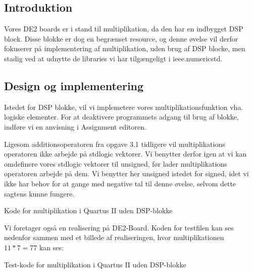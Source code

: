 \documentclass[../journal2.tex]{subfiles}
\begin{document}
\subsection{Introduktion}

Vores DE2 boards er i stand til multiplikation, da den har en indbygget DSP block. Disse blokke er dog en begrænset resource, og denne øvelse vil derfor fokuserer på implementering af multiplikation, uden brug af DSP blocke, men stadig ved at udnytte de libraries vi har tilgængeligt i ieee.numeric\textunderscore std.

\subsection{Design og implementering}

Istedet for DSP blokke, vil vi implemetere vores multiplikationsfunktion vha. logiske elementer. For at deaktivere programmets adgang til brug af blokke, indføre vi en anvisning i Assignment editoren.


Ligesom additionsoperatoren fra opgave 3.1 tidligere vil multiplikations operatoren ikke arbejde på std\textunderscore logic vektorer. Vi benytter derfor igen at vi kan omdefinere vores std\textunderscore logic vektorer til unsigned, før lader multiplikations operatoren arbejde på dem. Vi benytter her unsigned istedet for signed, idet vi ikke har behov for at gange med negative tal til denne øvelse, selvom dette sagtens kunne fungere.

\begin{table}[H]
    \centering
      \framebox{
        \rule{8pt}{0pt}
          
}
  \caption{Kode for multiplikation i Quartus II uden DSP-blokke}	
  \label{src:Tab12}
\end{table}

Vi foretager også en realisering på DE2-Board. Koden for testfilen kan ses nedenfor sammen med et billede af realiseringen, hvor multiplikationen $11*7=77$ kan ses:


\begin{table}[H]
    \centering
      \framebox{
        \rule{8pt}{0pt}
          
}
  \caption{Test-kode for multiplikation i Quartus II uden DSP-blokke}	
  \label{src:Tab22}
\end{table}
\end{document}
